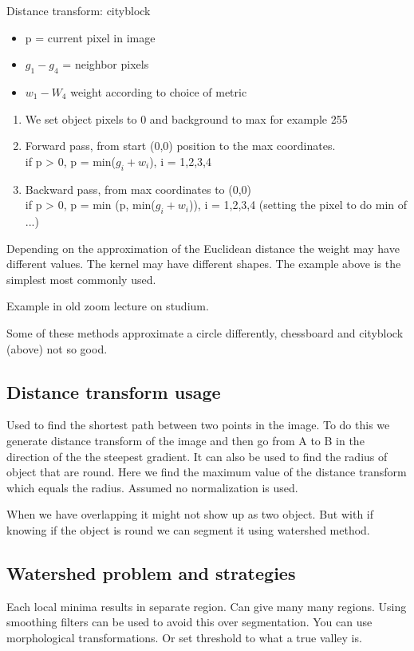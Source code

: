 \begin{definition}{Distance transform: cityblock}

\begin{itemize}
	\item p = current pixel in image
	\item $g_1 - g_4$ = neighbor pixels
	\item $w_1 - W_4$ weight according to choice of metric
\end{itemize}

\begin{enumerate}
	\item We set object pixels to 0 and background to max for example 255
	\item Forward pass, from start (0,0) position to the max coordinates. \\
	if p > 0, p = min($g_i + w_i$), i = 1,2,3,4
	\item Backward pass, from max coordinates to (0,0) \\
	if p > 0, p = min (p, min($g_i + w_i$)), i = 1,2,3,4 (setting the pixel to do min of ...)
\end{enumerate}

Depending on the approximation of the Euclidean distance the weight may have different values. The kernel may have different shapes. The example above is the simplest most commonly used.

Example in old zoom lecture on studium. 

Some of these methods approximate a circle differently, chessboard and cityblock (above) not so good. 
\end{definition}


\subsection*{Distance transform usage}
Used to find the shortest path between two points in the image. To do this we generate distance transform of the image and then go from A to B in the direction of the the steepest gradient. It can also be used to find the radius of object that are round. Here we find the maximum value of the distance transform  which equals the radius. Assumed no normalization is used. 


When we have overlapping it might not show up as two object. But with if knowing if the object is round we can segment it using watershed method. 

\subsection*{Watershed problem and strategies}
Each local minima results in separate region. Can give many many regions. Using smoothing filters can be used to avoid this over segmentation. You can use morphological transformations. Or set threshold to what a true valley is. 

